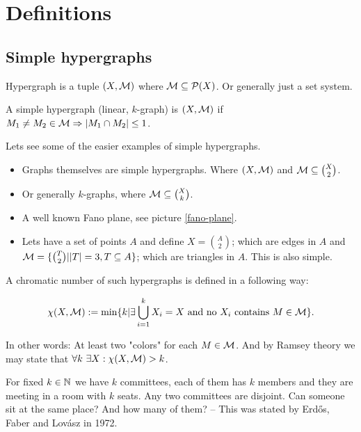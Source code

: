 \chapter{Definitions}

\section{Simple hypergraphs}

\begin{defn}
	Hypergraph is a tuple $(X, \mathcal{M})$ where $\mathcal{M} \subseteq \mathcal{P}(X)$. Or generally just a set system.
\end{defn}

\begin{defn}
	A simple hypergraph (linear, $k$-graph) is $(X,\mathcal{M})$ if $M_1 \neq M_2 \in \mathcal{M} \Rightarrow |M_1 \cap M_2| \leq 1$.
\end{defn}

\begin{example}
	Lets see some of the easier examples of simple hypergraphs.
	
	\begin{itemize}
		\item Graphs themselves are simple hypergraphs. Where $(X, \mathcal{M})$ and $\mathcal{M} \subseteq \binom{X}{2}$.
		\item Or generally $k$-graphs, where $\mathcal{M} \subseteq \binom{X}{k}$.
		\item A well known Fano plane, see picture \ref{fano-plane}.
		\item Lets have a set of points $A$ and define $X = \binom{A}{2}$; which are edges in $A$ and $\mathcal{M} = \{\binom{T}{2} | |T| = 3, T \subseteq A\}$; which are triangles in $A$. This is also simple.
	\end{itemize}
\end{example}


\begin{defn}
	A chromatic number of such hypergraphs is defined in a following way:
	
	$$
	\chi (X,\mathcal{M}) := \min \{k | \exists \bigcup_{i=1}^k X_i = X \text{ and no } X_i \text{ contains } M \in \mathcal{M}\}.
	$$
\end{defn}

\noindent In other words: At least two "colors" for each $M \in \mathcal{M}$. And by Ramsey theory we may state that $\forall k \ \exists X: \chi(X,\mathcal{M}) > k$.

\begin{example}
	For fixed $k \in \mathbb{N}$ we have $k$ committees, each of them has $k$ members and they are meeting in a room with $k$ seats. Any two committees are disjoint. Can someone sit at the same place? And how many of them? -- This was stated by Erd\H os, Faber and Lovász in 1972.
\end{example}

